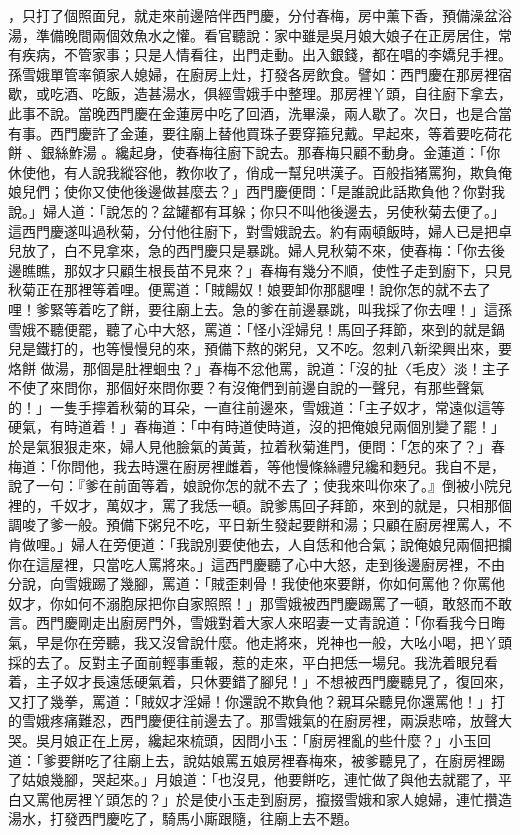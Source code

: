 ，只打了個照面兒，就走來前邊陪伴西門慶，分付春梅，房中薰下香，預備澡盆浴湯，準備晚間兩個效魚水之懽。看官聽說：家中雖是吳月娘大娘子在正房居住，常有疾病，不管家事；只是人情看往，出門走動。出入銀錢，都在唱的李嬌兒手裡。孫雪娥單管率領家人媳婦，在廚房上灶，打發各房飲食。譬如：西門慶在那房裡宿歇，或吃酒、吃飯，造甚湯水，俱經雪娥手中整理。那房裡丫頭，自往廚下拿去，此事不說。當晚西門慶在金蓮房中吃了回酒，洗畢澡，兩人歇了。次日，也是合當有事。西門慶許了金蓮，要往廟上替他買珠子要穿箍兒戴。早起來，等着要吃荷花餅 、銀絲鮓湯 。纔起身，使春梅往廚下說去。那春梅只顧不動身。金蓮道：「你休使他，有人說我縱容他，教你收了，俏成一幫兒哄漢子。百般指猪罵狗，欺負俺娘兒們；使你又使他後邊做甚麼去？」西門慶便問：「是誰說此話欺負他？你對我說。」婦人道：「說怎的？盆罐都有耳躲；你只不叫他後邊去，另使秋菊去便了。」這西門慶遂叫過秋菊，分付他往廚下，對雪娥說去。約有兩頓飯時，婦人已是把卓兒放了，白不見拿來，急的西門慶只是暴跳。婦人見秋菊不來，使春梅：「你去後邊瞧瞧，那奴才只顧生根長苗不見來？」春梅有幾分不順，使性子走到廚下，只見秋菊正在那裡等着哩。便罵道：「賊餳奴！娘要卸你那腿哩！說你怎的就不去了哩！爹緊等着吃了餅，要往廟上去。急的爹在前邊暴跳，叫我採了你去哩！」這孫雪娥不聽便罷，聽了心中大怒，罵道：「怪小淫婦兒！馬回子拜節，來到的就是鍋兒是鐵打的，也等慢慢兒的來，預備下熬的粥兒，又不吃。忽剌八新梁興出來，要烙餅 做湯，那個是肚裡蛔虫？」春梅不忿他罵，說道：「沒的扯〈毛皮〉淡！主子不使了來問你，那個好來問你要？有沒俺們到前邊自說的一聲兒，有那些聲氣的！」一隻手擰着秋菊的耳朵，一直往前邊來，雪娥道：「主子奴才，常遠似這等硬氣，有時道着！」春梅道：「中有時道使時道，沒的把俺娘兒兩個別變了罷！」於是氣狠狠走來，婦人見他臉氣的黃黃，拉着秋菊進門，便問：「怎的來了？」春梅道：「你問他，我去時還在廚房裡雌着，等他慢條絲禮兒纔和麪兒。我自不是，說了一句：『爹在前面等着，娘說你怎的就不去了；使我來叫你來了。』倒被小院兒裡的，千奴才，萬奴才，罵了我恁一頓。說爹馬回子拜節，來到的就是，只相那個調唆了爹一般。預備下粥兒不吃，平日新生發起要餅和湯；只顧在廚房裡罵人，不肯做哩。」婦人在旁便道：「我說別要使他去，人自恁和他合氣；說俺娘兒兩個把攔你在這屋裡，只當吃人罵將來。」這西門慶聽了心中大怒，走到後邊廚房裡，不由分說，向雪娥踢了幾腳，罵道：「賊歪剌骨！我使他來要餅，你如何罵他？你罵他奴才，你如何不溺胞尿把你自家照照！」那雪娥被西門慶踢罵了一頓，敢怒而不敢言。西門慶剛走出廚房門外，雪娥對着大家人來昭妻一丈青說道：「你看我今日晦氣，早是你在旁聽，我又沒曾說什麼。他走將來，兇神也一般，大吆小喝，把丫頭採的去了。反對主子面前輕事重報，惹的走來，平白把恁一場兒。我洗着眼兒看着，主子奴才長遠恁硬氣着，只休要錯了腳兒！」不想被西門慶聽見了，復回來，又打了幾拳，罵道：「賊奴才淫婦！你還說不欺負他？親耳朵聽見你還罵他！」打的雪娥疼痛難忍，西門慶便往前邊去了。那雪娥氣的在廚房裡，兩淚悲啼，放聲大哭。吳月娘正在上房，纔起來梳頭，因問小玉：「廚房裡亂的些什麼？」小玉回道：「爹要餅吃了往廟上去，說姑娘罵五娘房裡春梅來，被爹聽見了，在廚房裡踢了姑娘幾腳，哭起來。」月娘道：「也沒見，他要餅吃，連忙做了與他去就罷了，平白又罵他房裡丫頭怎的？」於是使小玉走到廚房，攛掇雪娥和家人媳婦，連忙攢造湯水，打發西門慶吃了，騎馬小廝跟隨，往廟上去不題。

